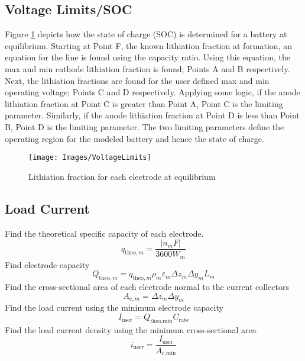 \documentclass[12pt]{article}
\begin{document}
\subsection{Voltage Limits/SOC}
Figure \ref{fig:VoltageLimits} depicts how the state of charge (SOC) is determined for a battery at equilibrium. Starting at Point F, the known lithiation fraction at formation, an equation for the line is found using the capacity ratio. Using this equation, the max and min cathode lithiation fraction is found; Points A and B respectively. Next, the lithiation fractions are found for the user defined max and min operating voltage; Points C and D respectively. Applying some logic, if the anode lithiation fraction at Point C is greater than Point A, Point C is the limiting parameter. Similarly, if the anode lithiation fraction at Point D is less than Point B, Point D is the limiting parameter. The two limiting parameters define the operating region for the modeled battery and hence the state of charge.
\begin{figure} [h]
	\centering
	\texttt{[image: Images/VoltageLimits]}
	\caption{Lithiation fraction for each electrode at equilibrium}
	\label{fig:VoltageLimits}
\end{figure}
\clearpage
\subsection{Load Current}
Find the theoretical specific capacity of each electrode. 
\begin{equation}
q_{\textrm{theo},m}= \frac{|n_m F|}{3600 W_m}
\end{equation}
Find electrode capacity
\begin{equation}
Q_{\textrm{theo},m} = q_{\textrm{theo},m}\rho_m \varepsilon_m \Delta z_m \Delta y_m L_m
\end{equation}
Find the cross-sectional area of each electrode normal to the current collectors
\begin{equation}
A_{\textrm{c},m}= \Delta z_m \Delta y_m
\end{equation}
Find the load current using the minimum electrode capacity
\begin{equation}
I_\textrm{user} = Q_{\textrm{theo,min}} C_\textrm{rate}
\end{equation}
Find the load current density using the minimum cross-sectional area
\begin{equation}
i_\textrm{user}= \frac{I_\textrm{user}}{A_{\textrm{c,min}}}
\end{equation}
\end{document}
